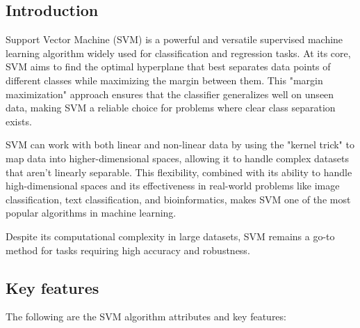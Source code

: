 \subsection{Introduction}
\label{subsec:introduction-svm}

Support Vector Machine (SVM) is a powerful and versatile supervised machine learning algorithm widely used for classification and regression tasks.
At its core, SVM aims to find the optimal hyperplane that best separates data points of different classes while maximizing the margin between them.
This "margin maximization" approach ensures that the classifier generalizes well on unseen data, making SVM a reliable choice for problems where clear class separation exists.

SVM can work with both linear and non-linear data by using the "kernel trick" to map data into higher-dimensional spaces, allowing it to handle complex datasets that aren't linearly separable.
This flexibility, combined with its ability to handle high-dimensional spaces and its effectiveness in real-world problems like image classification, text classification, and bioinformatics, makes SVM one of the most popular algorithms in machine learning.

Despite its computational complexity in large datasets, SVM remains a go-to method for tasks requiring high accuracy and robustness.

\subsection{Key features}
\label{subsec:key-features}

The following are the SVM algorithm attributes and key features:

\renewcommand{\labelitemi}{-}
\renewcommand{\labelitemii}{\bullet}
\renewcommand{\labelitemiii}{\circ}

